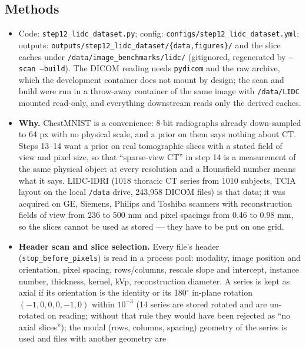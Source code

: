 \documentclass[11pt]{article}
\begin{document}
\subsection{Methods}
\begin{itemize}
  \item Code: \texttt{step12\_lidc\_dataset.py}; config:
        \texttt{configs/step12\_lidc\_dataset.yml}; outputs:
        \texttt{outputs/step12\_lidc\_dataset/\{data,figures\}/} and the
        slice caches under \texttt{/data/image\_benchmarks/lidc/} (gitignored,
        regenerated by \texttt{--scan --build}). The DICOM reading needs
        \texttt{pydicom} and the raw archive, which the development container
        does not mount by design; the scan and build were run in a throw-away
        container of the same image with \texttt{/data/LIDC} mounted read-only,
        and everything downstream reads only the derived caches.
  \item \textbf{Why.} ChestMNIST is a convenience: 8-bit radiographs
        already down-sampled to 64 px with no physical scale, and a prior on
        them says nothing about CT. Steps 13--14 want a prior on real
        tomographic slices with a stated field of view and pixel size, so that
        ``sparse-view CT'' in step 14 is a measurement of the same physical
        object at every resolution and a Hounsfield number means what it
        says. LIDC-IDRI (1018 thoracic CT series from 1010 subjects, TCIA
        layout on the local \texttt{/data} drive, 243,958 DICOM files) is
        that data; it was acquired on GE, Siemens, Philips and Toshiba
        scanners with reconstruction fields of view from 236 to 500 mm and
        pixel spacings from 0.46 to 0.98 mm, so the slices cannot be used as
        stored --- they have to be put on one grid.
  \item \textbf{Header scan and slice selection.} Every file's header
        (\texttt{stop\_before\_pixels}) is read in a process pool: modality,
        image position and orientation, pixel spacing, rows/columns, rescale
        slope and intercept, instance number, thickness, kernel, kVp,
        reconstruction diameter. A series is kept as axial if its
        orientation is the identity or its 180$^\circ$ in-plane rotation
        $(-1,0,0,0,-1,0)$ within $10^{-3}$ (14 series are stored rotated and
        are un-rotated on reading; without that rule they would have been
        rejected as ``no axial slices''); the modal (rows, columns, spacing)
        geometry of the series is used and files with another geometry are

\end{itemize}
\end{document}
